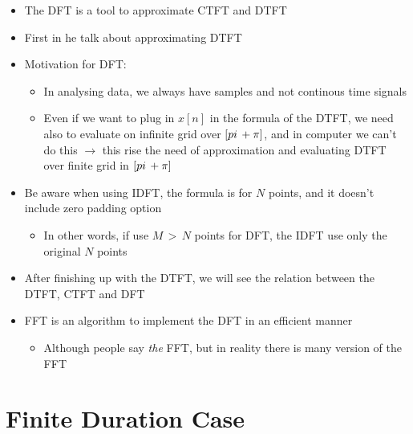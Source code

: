 \begin{itemize}
    \item The DFT is a tool to approximate CTFT and DTFT
    
    \item First in \cite{DSP_Proakis} he talk about approximating DTFT
    
    \item Motivation for DFT:
    
        \begin{itemize}
            \item In analysing data, we always have samples and not continous time signals
            
            \item Even if we want to plug in $x[n]$ in the formula of the DTFT, we need also to evaluate on infinite grid over $[\-pi \, + \pi]$, and in computer we can't do this $\rightarrow$ this rise the need of approximation and evaluating DTFT over finite grid in $[\-pi \, + \pi]$
        \end{itemize}
    
    
    \item Be aware when using IDFT, the formula is for $N$ points, and it doesn't include zero padding option
    
        \begin{itemize}
            \item In other words, if use $M \, > \, N$ points for DFT, the IDFT use only the original $N$ points
        \end{itemize}
    
    
    \item After finishing up with the DTFT, we will see the relation between the DTFT, CTFT and DFT
    
    
    \item FFT is an algorithm to implement the DFT in an efficient manner
    
        \begin{itemize}
            \item Although people say \textit{the} FFT, but in reality there is many version of the FFT
        \end{itemize}
    
\end{itemize}


\section{Finite Duration Case}

